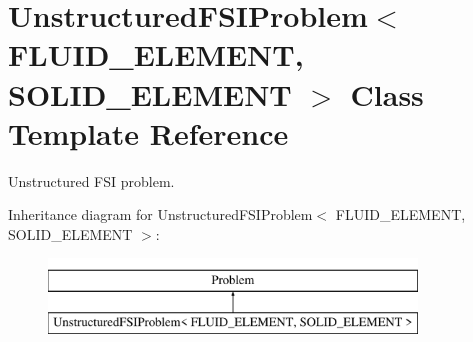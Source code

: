 \hypertarget{classUnstructuredFSIProblem}{}\section{Unstructured\+F\+S\+I\+Problem$<$ F\+L\+U\+I\+D\+\_\+\+E\+L\+E\+M\+E\+NT, S\+O\+L\+I\+D\+\_\+\+E\+L\+E\+M\+E\+NT $>$ Class Template Reference}
\label{classUnstructuredFSIProblem}


Unstructured F\+SI problem.  


Inheritance diagram for Unstructured\+F\+S\+I\+Problem$<$ F\+L\+U\+I\+D\+\_\+\+E\+L\+E\+M\+E\+NT, S\+O\+L\+I\+D\+\_\+\+E\+L\+E\+M\+E\+NT $>$\+:\begin{figure}[H]
\begin{center}
\leavevmode
\includegraphics[height=2.000000cm]{classUnstructuredFSIProblem}
\end{center}
\end{figure}
